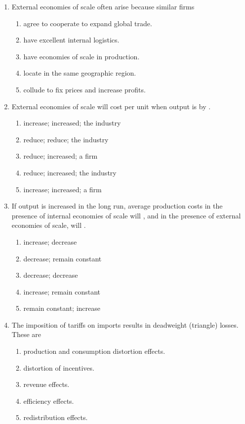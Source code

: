 \documentclass[12pt]{article}
\begin{document}
\begin{enumerate}[label=\textbf{\arabic*.}]
\item External economies of scale often arise because similar firms
\begin{enumerate}[label=\Alph*.]
\item agree to cooperate to expand global trade.
\item have excellent internal logistics.
\item have economies of scale in production.
\item locate in the same geographic region.
\item collude to fix prices and increase profits.
\end{enumerate}
\newpage
\item External economies of scale will \underline{\hspace{2em}} cost per unit when output is \underline{\hspace{2em}} by \underline{\hspace{2em}}.
\begin{enumerate}[label=\Alph*.]
\item increase; increased; the industry
\item reduce; reduce; the industry
\item reduce; increased; a firm
\item reduce; increased; the industry
\item increase; increased; a firm
\end{enumerate}

\item If output is increased in the long run, average production costs in the presence of internal economies of scale will \underline{\hspace{2em}}, and in the presence of external economies of scale, will \underline{\hspace{2em}}.
\begin{enumerate}[label=\Alph*.]
\item increase; decrease
\item decrease; remain constant
\item decrease; decrease
\item increase; remain constant
\item remain constant; increase
\end{enumerate}

\item The imposition of tariffs on imports results in deadweight (triangle) losses. These are
\begin{enumerate}[label=\Alph*.]
\item production and consumption distortion effects.
\item distortion of incentives.
\item revenue effects.
\item efficiency effects.
\item redistribution effects.
\end{enumerate}


\end{enumerate}
\end{document}
